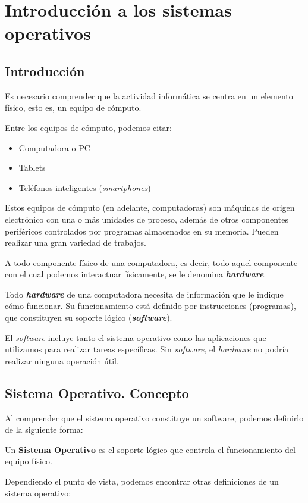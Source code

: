 \chapter{Introducción a los sistemas operativos}
\section{
Introducción
}
Es necesario comprender que la actividad informática se centra en un elemento físico\cite{introsistema}, esto es, un equipo de cómputo.

Entre los equipos de cómputo, podemos citar:
\begin{itemize}
	\item  Computadora o PC
	\item Tablets
	\item Teléfonos inteligentes (\textit{smartphones})
\end{itemize}


Estos equipos de cómputo (en adelante, computadoras) son máquinas de origen electrónico con una o más unidades de proceso, además de otros componentes periféricos controlados por programas almacenados en su memoria. Pueden realizar una gran variedad de trabajos.

A todo componente físico de una computadora, es decir, todo aquel componente con el cual podemos interactuar físicamente, se le denomina \textit{\textbf{hardware}}.

Todo \textbf{\textit{hardware}} de una computadora necesita de información que le indique cómo funcionar. Su funcionamiento está definido por instrucciones (programas), que constituyen su soporte lógico (\textbf{\textit{software}}). 

El \textit{software} incluye tanto el sistema operativo como las aplicaciones que utilizamos para realizar tareas específicas. Sin \textit{software}, el \textit{hardware} no podría realizar ninguna operación útil.



\section{Sistema Operativo. Concepto}
Al comprender que el sistema operativo constituye un software, podemos definirlo de la siguiente forma:
\begin{tcolorbox}
	Un \textbf{Sistema Operativo }es el soporte lógico que controla el funcionamiento del equipo físico\cite{introsistema}.
\end{tcolorbox}
Dependiendo el punto de vista, podemos encontrar otras definiciones de un sistema operativo:

